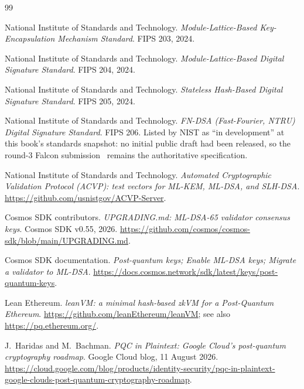 \begin{thebibliography}{99}

 National Institute of Standards and Technology.
\newblock \emph{Module-Lattice-Based Key-Encapsulation Mechanism Standard}.
\newblock FIPS 203, 2024.

 National Institute of Standards and Technology.
\newblock \emph{Module-Lattice-Based Digital Signature Standard}.
\newblock FIPS 204, 2024.

 National Institute of Standards and Technology.
\newblock \emph{Stateless Hash-Based Digital Signature Standard}.
\newblock FIPS 205, 2024.

 National Institute of Standards and Technology.
\newblock \emph{FN-DSA (Fast-Fourier, NTRU) Digital Signature Standard}.
\newblock FIPS 206. Listed by NIST as ``in development'' at this book's
standards snapshot: no initial public draft had been released, so the
round-3 Falcon submission~\cite{falcon2020} remains the authoritative
specification.

 National Institute of Standards and Technology.
\newblock \emph{Automated Cryptographic Validation Protocol (ACVP): test
vectors for ML-KEM, ML-DSA, and SLH-DSA}.
\newblock \url{https://github.com/usnistgov/ACVP-Server}.

 Cosmos SDK contributors.
\newblock \emph{UPGRADING.md: ML-DSA-65 validator consensus keys}.
\newblock Cosmos SDK v0.55, 2026.
\newblock \url{https://github.com/cosmos/cosmos-sdk/blob/main/UPGRADING.md}.

 Cosmos SDK documentation.
\newblock \emph{Post-quantum keys; Enable ML-DSA keys; Migrate a validator to ML-DSA}.
\newblock \url{https://docs.cosmos.network/sdk/latest/keys/post-quantum-keys}.

 Lean Ethereum.
\newblock \emph{leanVM: a minimal hash-based zkVM for a Post-Quantum Ethereum}.
\newblock \url{https://github.com/leanEthereum/leanVM}; see also \url{https://pq.ethereum.org/}.

 J.~Haridas and M.~Bachman.
\newblock \emph{PQC in Plaintext: Google Cloud's post-quantum cryptography
roadmap}.
\newblock Google Cloud blog, 11 August 2026.
\newblock \url{https://cloud.google.com/blog/products/identity-security/pqc-in-plaintext-google-clouds-post-quantum-cryptography-roadmap}.


\end{thebibliography}
